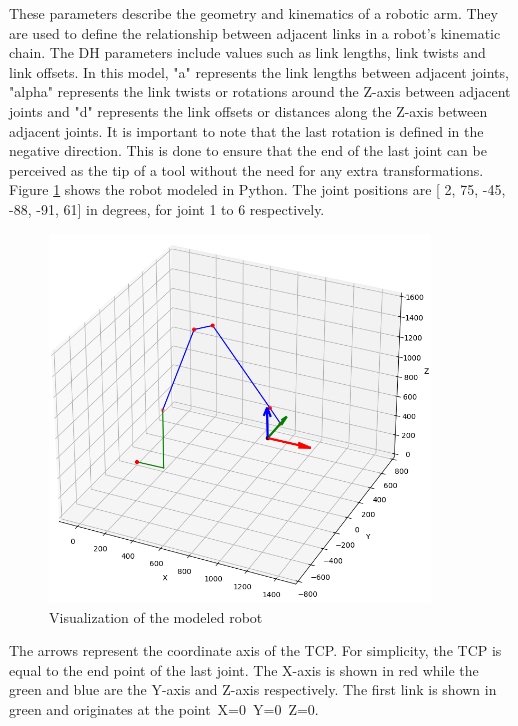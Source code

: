 These parameters describe the geometry and kinematics of a robotic arm. They are used to define the relationship between adjacent links in a robot's kinematic chain. The DH parameters include values such as link lengths, link twists and link offsets. In this model, "a" represents the link lengths between adjacent joints, "alpha" represents the link twists or rotations around the Z-axis between adjacent joints and "d" represents the link offsets or distances along the Z-axis between adjacent joints. 
It is important to note that the last rotation is defined in the negative direction. This is done to ensure that the end of the last joint can be perceived as the tip of a tool without the need for any extra transformations.
Figure \ref{robotprog} shows the robot modeled in Python. The joint positions are [  2,  75, -45,  -88, -91,  61] in degrees, for joint 1 to 6 respectively.

 \begin{figure}[H]
	\centerline{\includegraphics[width=0.9\textwidth]{figures/robotprog.png}}
	\caption{Visualization of the modeled robot}
	\label{robotprog}
\end{figure}


The arrows represent the coordinate axis of the TCP. For simplicity, the TCP is equal to the end point of the last joint. The X-axis is shown in red while the green and blue are the Y-axis and Z-axis respectively. The first link is shown in green and originates at the point~X=0~Y=0~Z=0.


